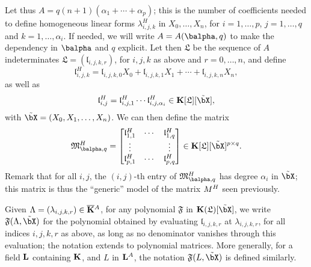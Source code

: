 \documentclass[12pt]{article}
\begin{document}


Let thus $A=q(n+1)(\alpha_1 + \cdots + \alpha_p)$; this is the number
of coefficients needed to define homogeneous linear forms
$\lambda^H_{i,j,k}$ in $X_0,\dots,X_n$, for $i=1,\dots,p$,
$j=1,\dots,q$ and $k=1,\dots,\alpha_i$. If needed, we will write
$A=A(\balpha,q)$ to make the dependency in $\balpha$ and $q$ explicit.
Let then $\mathfrak{L}$ be the sequence of $A$ indeterminates
$\mathfrak{L}=(\mathfrak{l}_{i,j,k,r})$, for $i,j,k$ as above and
$r=0,\dots,n$, and define
$$\mathfrak{l}^H_{i,j,k} = \mathfrak{l}_{i,j,k,0}X_0 + \mathfrak{l}_{i,j,k,1} X_1 +\cdots + \mathfrak{l}_{i,j,k,n} X_n,$$
as well as 
$$\mathfrak{l}^H_{i,j} = \mathfrak{l}^H_{i,j,1} \cdots \mathfrak{l}^H_{i,j,\alpha_i} \in \KK[\mathfrak{L}][\tilde\bX],$$
with $\tilde\bX=(X_0,X_1,\dots,X_n)$. We can then define the
matrix
\begin{align}\label{eq:matM}
\mathfrak{M}^H_{\balpha,q}=\left [\begin{matrix}
\mathfrak{l}^H_{1,1} & \cdots & \mathfrak{l}^H_{1,q}\\
 \vdots & & \vdots\\
\mathfrak{l}^H_{p,1} & \cdots & \mathfrak{l}^H_{p,q}
  \end{matrix}\right ]\in \KK[\mathfrak{L}][\tilde\bX]^{p\times q}.  
\end{align}
Remark that for all $i,j$, the $(i,j)$-th entry of
$\mathfrak{M}^H_{\balpha,q}$ has degree $\alpha_i$ in $\tilde \bX$;
this matrix is thus the ``generic'' model of the matrix ${M}^H$ seen previously.

Given $\Lambda=(\lambda_{i,j,k,r})\in \overline{\mathbf{K}}{}^A$, for any polynomial
$\mathfrak{F}$ in $\KK(\mathfrak{L})[\tilde \bX]$, we write
$\mathfrak{F}(\Lambda,\tilde\bX)$ for the polynomial obtained by
evaluating $\mathfrak{l}_{i,j,k,r}$ at $\lambda_{i,j,k,r}$, for all
indices $i,j,k,r$ as above, as long as no denominator vanishes through
this evaluation; the notation extends to polynomial matrices. More
generally, for a field $\mathbf{L}$ containing $\mathbf{K}$, and $L$ in $\mathbf{L}^A$, the
notation $\mathfrak{F}(L,\tilde\bX)$ is defined similarly.
\end{document}
